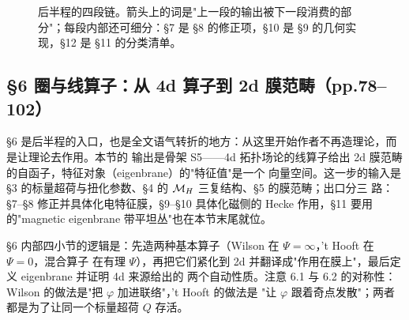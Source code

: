 \begin{figure}[htbp]
\centering
{}
\caption{后半程的四段链。箭头上的词是"上一段的输出被下一段消费的部分"；每段内部还可细分：\S7 是
\S8 的修正项，\S10 是 \S9 的几何实现，\S12 是 \S11 的分类清单。}
\label{fig:geom-chain}
\end{figure}

\subsection{\S6 圈与线算子：从 4d 算子到 2d 膜范畴（pp.78--102）}

\S6 是后半程的入口，也是全文语气转折的地方：从这里开始作者不再造理论，而是让理论去作用。本节的
输出是骨架 S5——4d 拓扑场论的线算子给出 2d 膜范畴的自函子，特征对象（eigenbrane）的"特征值"是一个
向量空间。这一步的输入是 \S3 的标量超荷与扭化参数、\S4 的 $\mathcal{M}_H$ 三复结构、\S5 的膜范畴；出口分三
路：\S7--\S8 修正并具体化电特征膜，\S9--\S10 具体化磁侧的 Hecke 作用，\S11 要用的"magnetic
eigenbrane 带平坦丛"也在本节末尾就位。

\S6 内部四小节的逻辑是：先造两种基本算子（Wilson 在 $\Psi=\infty$，'t Hooft 在 $\Psi=0$，混合算子
在有理 $\Psi$），再把它们紧化到 2d 并翻译成"作用在膜上"，最后定义 eigenbrane 并证明 4d 来源给出的
两个自动性质。注意 6.1 与 6.2 的对称性：Wilson 的做法是"把 $\varphi$ 加进联络"，'t Hooft 的做法是
"让 $\varphi$ 跟着奇点发散"；两者都是为了让同一个标量超荷 $Q$ 存活。

